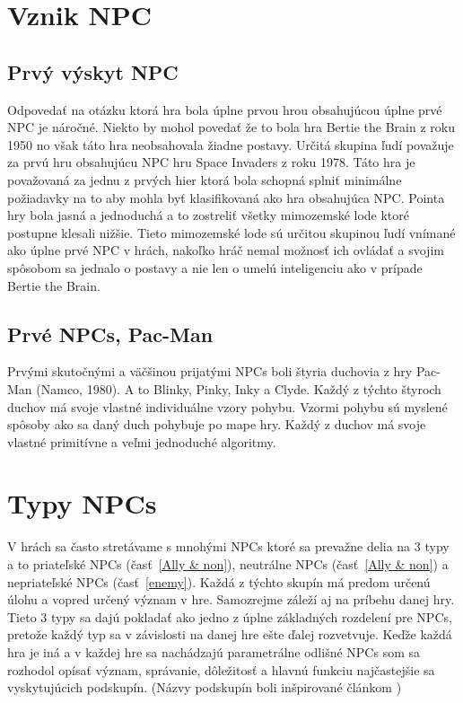 \documentclass[10pt,twoside,slovak,a4paper]{article}
\begin{document}
\section{Vznik NPC}    \label{Vznik}
\subsection{Prvý výskyt NPC} \label{NPC 1 time}
Odpovedať na otázku ktorá hra bola úplne prvou hrou obsahujúcou úplne prvé NPC je náročné. Niekto by mohol povedať že to bola hra Bertie the Brain z roku 1950 no však táto hra neobsahovala žiadne postavy. Určitá skupina ľudí považuje za prvú hru obsahujúcu NPC hru Space Invaders z roku 1978. Táto hra je považovaná za jednu z prvých hier ktorá bola schopná splniť minimálne požiadavky na to aby mohla byť klasifikovaná ako hra obsahujúca NPC. Pointa hry bola jasná a jednoduchá a to zostreliť všetky mimozemské lode ktoré postupne klesali nižšie. Tieto mimozemské lode sú určitou skupinou ľudí vnímané ako úplne prvé NPC v hrách, nakoľko hráč nemal možnosť ich ovládať a svojim spôsobom sa jednalo o postavy a nie len o umelú inteligenciu ako v prípade Bertie the Brain. 


\subsection{Prvé NPCs, Pac-Man}
Prvými skutočnými a väčšinou prijatými NPCs boli štyria duchovia z hry Pac-Man (Namco, 1980). A to Blinky, Pinky, Inky a Clyde. Každý z týchto štyroch duchov má svoje vlastné individuálne vzory pohybu. Vzormi pohybu sú myslené spôsoby ako sa daný duch pohybuje po mape hry. Každý z duchov má svoje vlastné primitívne a veľmi jednoduché algoritmy. \cite{Hack2018}
 



\section{Typy NPCs}     \label{Typy}
V hrách sa často stretávame s mnohými NPCs ktoré sa prevažne delia na 3 typy a to priateľské NPCs (časť~\ref{Ally & non}), neutrálne NPCs (časť~\ref{Ally & non}) a nepriateľské NPCs (časť~\ref{enemy}). Každá z týchto skupín má predom určenú úlohu a vopred určený význam v hre. Samozrejme záleží aj na príbehu danej hry. Tieto 3 typy sa dajú pokladať ako jedno z úplne základných rozdelení pre NPCs, pretože každý typ sa v závislosti na danej hre ešte ďalej rozvetvuje. Keďže každá hra je iná a v každej hre sa nachádzajú parametrálne odlišné NPCs som sa rozhodol opísať význam, správanie, dôležitosť a hlavnú funkciu najčastejšie sa vyskytujúcich podskupín. (Názvy podskupín boli inšpirované článkom \cite{phdthesis})
\end{document}
